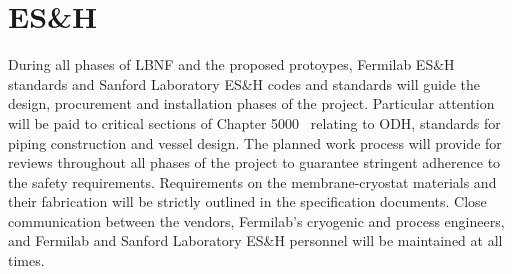 \chapter{ES\&H}
\label{sec:cryo-cryosys-esh}

During all phases of LBNF and the proposed protoypes, Fermilab ES\&H standards and
Sanford Laboratory ES\&H codes and standards will guide the design, procurement and
installation phases of the project. Particular attention will be paid to critical sections of
Chapter 5000~\cite{feshm} relating to ODH, standards for piping construction and vessel design. The
planned work process will provide for reviews throughout all phases of the project to guarantee
stringent adherence to the safety requirements. Requirements on the membrane-cryostat
materials and their fabrication will be strictly outlined in the specification documents. Close
communication between the vendors, Fermilab's cryogenic and process engineers, and Fermilab and Sanford Laboratory ES\&H personnel will be maintained at all times.
